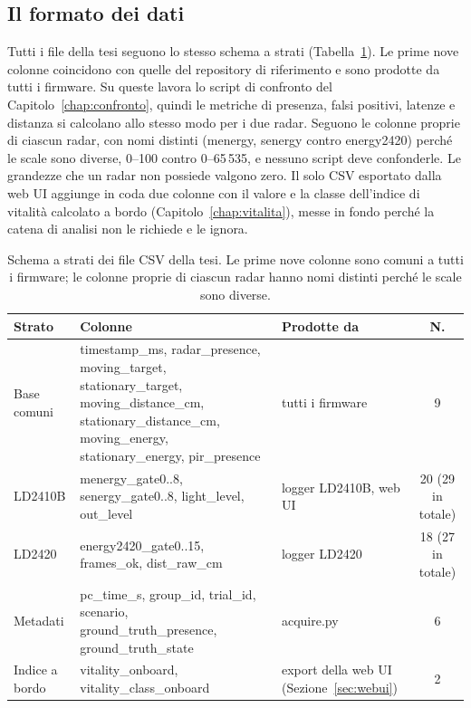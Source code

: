 \subsection{Il formato dei dati}
\label{sec:c3-4-3}

Tutti i file della tesi seguono lo stesso schema a strati (Tabella~\ref{tab:c3-15}). Le prime nove colonne coincidono con quelle del repository di riferimento e sono prodotte da tutti i firmware. Su queste lavora lo script di confronto del Capitolo~\ref{chap:confronto}, quindi le metriche di presenza, falsi positivi, latenze e distanza si calcolano allo stesso modo per i due radar. Seguono le colonne proprie di ciascun radar, con nomi distinti (menergy, senergy contro energy2420) perché le scale sono diverse, 0--100 contro 0--65\,535, e nessuno script deve confonderle. Le grandezze che un radar non possiede valgono zero. Il solo CSV esportato dalla web UI aggiunge in coda due colonne con il valore e la classe dell'indice di vitalità calcolato a bordo (Capitolo~\ref{chap:vitalita}), messe in fondo perché la catena di analisi non le richiede e le ignora.

\begin{table}[!htb]
\centering
\caption{Schema a strati dei file CSV della tesi. Le prime nove colonne sono comuni a tutti i firmware; le colonne proprie di ciascun radar hanno nomi distinti perché le scale sono diverse.}
\label{tab:c3-15}
\small
\begin{tabularx}{\linewidth}{@{}>{\raggedright\arraybackslash}p{2.1cm}>{\raggedright\arraybackslash}X>{\raggedright\arraybackslash}p{2.4cm}c@{}}
\toprule
\textbf{Strato} & \textbf{Colonne} & \textbf{Prodotte da} & \textbf{N.} \\
\midrule
Base comuni & timestamp\_\allowbreak{}ms, radar\_\allowbreak{}presence, moving\_\allowbreak{}target, stationary\_\allowbreak{}target, moving\_\allowbreak{}distance\_\allowbreak{}cm, stationary\_\allowbreak{}distance\_\allowbreak{}cm, moving\_\allowbreak{}energy, stationary\_\allowbreak{}energy, pir\_\allowbreak{}presence & tutti i firmware & 9 \\
LD2410B & menergy\_\allowbreak{}gate0..8, senergy\_\allowbreak{}gate0..8, light\_\allowbreak{}level, out\_\allowbreak{}level & logger LD2410B, web UI & 20 (29 in totale) \\
LD2420 & energy2420\_\allowbreak{}gate0..15, frames\_\allowbreak{}ok, dist\_\allowbreak{}raw\_\allowbreak{}cm & logger LD2420 & 18 (27 in totale) \\
Metadati & pc\_\allowbreak{}time\_\allowbreak{}s, group\_\allowbreak{}id, trial\_\allowbreak{}id, scenario, ground\_\allowbreak{}truth\_\allowbreak{}presence, ground\_\allowbreak{}truth\_\allowbreak{}state & acquire.py & 6 \\
Indice a bordo & vitality\_\allowbreak{}onboard, vitality\_\allowbreak{}class\_\allowbreak{}onboard & export della web UI (Sezione~\ref{sec:webui}) & 2 \\
\bottomrule
\end{tabularx}
\end{table}

